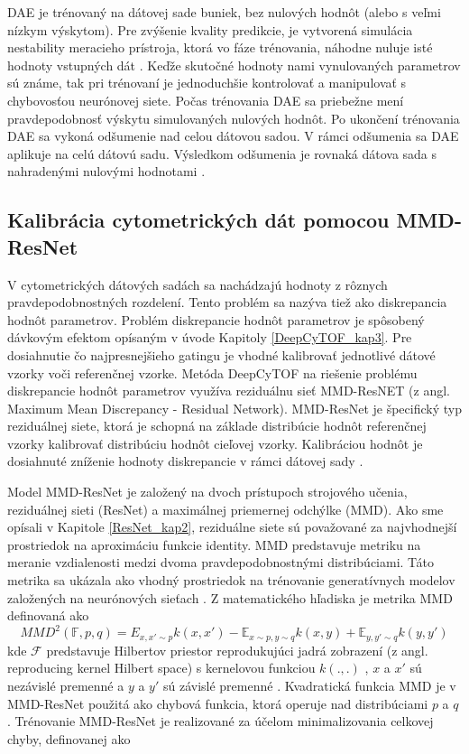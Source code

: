 DAE je trénovaný na dátovej sade buniek, bez nulových hodnôt (alebo s veľmi nízkym výskytom). Pre zvýšenie kvality predikcie, je vytvorená simulácia nestability meracieho prístroja, ktorá vo fáze trénovania, náhodne nuluje isté hodnoty vstupných dát \cite{Li2017}. Keďže skutočné hodnoty nami vynulovaných parametrov sú známe, tak pri trénovaní je jednoduchšie kontrolovať a manipulovať s chybovosťou neurónovej siete. Počas trénovania DAE sa priebežne mení pravdepodobnosť výskytu simulovaných nulových hodnôt. Po ukončení trénovania DAE sa vykoná odšumenie nad celou dátovou sadou. V rámci odšumenia sa DAE aplikuje na celú dátovú sadu. Výsledkom odšumenia je rovnaká dátova sada s nahradenými nulovými hodnotami \cite{Li2017}.

\subsection{Kalibrácia cytometrických dát pomocou MMD-ResNet}
\label{kalibracia_dat}

V cytometrických dátových sadách sa nachádzajú hodnoty z rôznych pravdepodobnostných rozdelení. Tento problém sa nazýva tiež ako diskrepancia hodnôt parametrov. Problém diskrepancie hodnôt parametrov je spôsobený dávkovým efektom opísaným v úvode Kapitoly \ref{DeepCyTOF_kap3}.
Pre dosiahnutie čo najpresnejšieho gatingu je vhodné kalibrovať jednotlivé dátové vzorky voči referenčnej vzorke. Metóda DeepCyTOF na riešenie problému diskrepancie hodnôt parametrov využíva reziduálnu sieť MMD-ResNET (z angl. Maximum Mean Discrepancy - Residual Network). MMD-ResNet je špecifický typ reziduálnej siete, ktorá je schopná na základe distribúcie hodnôt referenčnej vzorky kalibrovať distribúciu hodnôt cieľovej vzorky. Kalibráciou hodnôt je dosiahnuté zníženie hodnoty diskrepancie v rámci dátovej sady \cite{Li2017}.

Model MMD-ResNet je založený na dvoch prístupoch strojového učenia, reziduálnej sieti (ResNet) a maximálnej priemernej odchýlke (MMD). Ako sme opísali v Kapitole \ref{ResNet_kap2}, reziduálne siete sú považované za najvhodnejší prostriedok na aproximáciu funkcie identity. MMD predstavuje metriku na meranie vzdialenosti medzi dvoma pravdepodobnostnými distribúciami. Táto metrika sa ukázala ako vhodný prostriedok na trénovanie generatívnych modelov založených na neurónových sieťach \cite{Li2017, Li2016, He2016, Wu2017}. Z matematického hľadiska je metrika MMD definovaná ako
\begin{equation}
    MMD^2 (\mathbb{F},p,q)=\mathrm{}{E}_{x,x'\sim p}k(x,x') - \mathbb{E}_{x\sim p,y\sim q}k(x,y) + \mathbb{E}_{y,y'\sim q}k(y,y')
\end{equation}
kde $\mathcal{F}$ predstavuje Hilbertov priestor \cite{HilbSpace, Alvarez2012} reprodukujúci jadrá zobrazení (z angl. reproducing kernel Hilbert space) s kernelovou funkciou $k(.,.)$ \cite{Alvarez2012}, $x$ a $x'$ sú nezávislé premenné a $y$ a $y'$ sú závislé premenné \cite{Li2017}. Kvadratická funkcia MMD je v MMD-ResNet použitá ako chybová funkcia, ktorá operuje nad distribúciami $p$ a $q$ \cite{Li2017}. Trénovanie MMD-ResNet je realizované za účelom minimalizovania celkovej chyby, definovanej ako

